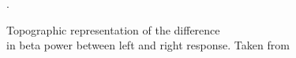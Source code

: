 \documentclass[11pt]{exam}
\begin{document}
\begin{itemize}
\begin{itemize}
            \begin{figure}[htbp]
                \centering
                 \caption{Topographic representation of the difference\\in beta power between left and right response. Taken from \href{https://www.fieldtriptoolbox.org/workshop/oslo2019/timefrequency/}{}}.
            \end{figure}


\end{itemize}
\end{itemize}
\end{document}
